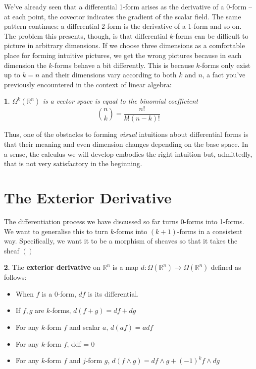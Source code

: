\documentclass[oneside,english]{amsbook}
\numberwithin{section}{chapter}
\theoremstyle{plain}
\newtheorem{thm}{\protect\theoremname}
\theoremstyle{definition}
\newtheorem{defn}[thm]{\protect\definitionname}
\providecommand{\definitionname}{Definition}
\providecommand{\theoremname}{Theorem}
\begin{document}
			We've already seen that a differential 1-form arises as the derivative of a 0-form -- at each point, the covector indicates the gradient of the scalar field. The same pattern continues: a differential 2-form is the derivative of a 1-form and so on. The problem this presents, though, is that differential $k$-forms can be difficult to picture in arbitrary dimensions. If we choose three dimensions as a comfortable place for forming intuitive pictures, we get the wrong pictures because in each dimension the $k$-forms behave a bit differently. This is because $k$-forms only exist up to $k=n$ and their dimensions vary according to both $k$ and $n$, a fact you've previously encountered in the context of linear algebra:
			
			\begin{thm}
				$\Omega^k(\mathbb{R}^n)$ is a vector space is equal to the binomial coefficient 
				\[
					\binom{n}{k} = \frac{n!}{k!(n-k)!}
				\]
			\end{thm}
			
			Thus, one of the obstacles to forming \emph{visual} intuitions about differential forms is that their meaning and even dimension changes depending on the base space. In a sense, the calculus we will develop embodies the right intuition but, admittedly, that is not very satisfactory in the beginning. 

		\section{The Exterior Derivative}

			The differentiation process we have discussed so far turns 0-forms into 1-forms. We want to generalise this to turn $k$-forms into $(k+1)$-forms in a consistent way. Specifically, we want it to be a morphism of sheaves so that it takes the sheaf $()$
			
			\begin{defn}
				The \textbf{exterior derivative} on $\mathbb{R}^n$ is a map $d:\Omega(\mathbb{R}^n)\to \Omega(\mathbb{R}^n)$ defined as follows:
				\begin{itemize}
					\item When $f$ is a 0-form, $df$ is its differential.
					\item If $f, g$ are $k$-forms, $d(f + g) = df + dg$
					\item For any $k$-form $f$ and scalar $a$, $d(af) = adf$
					\item For any $k$-form $f$, ddf = 0
					\item For any $k$-form $f$ and $j$-form $g$, $d(f\wedge g) = df\wedge g + (-1)^kf\wedge dg$
				\end{itemize}
			\end{defn}
			
\end{document}
